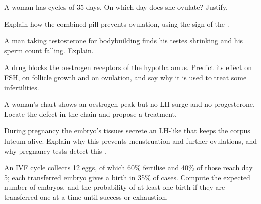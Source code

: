 \begin{exercise}[$\star\star$]\label{exo:g11:hormones-and-reproduction:9}
A woman has cycles of 35 days. On which day does she ovulate?
Justify.
\end{exercise}

\begin{exercise}[$\star\star$]\label{exo:g11:hormones-and-reproduction:10}
Explain how the combined pill prevents ovulation, using the sign of
the .
\end{exercise}

\begin{exercise}[$\star\star$]\label{exo:g11:hormones-and-reproduction:11}
A man taking testosterone for bodybuilding finds his testes shrinking
and his sperm count falling. Explain.
\end{exercise}

\begin{exercise}[$\star\star\star$]\label{exo:g11:hormones-and-reproduction:12}
A drug blocks the oestrogen receptors of the hypothalamus. Predict
its effect on FSH, on follicle growth and on ovulation, and say why
it is used to treat some infertilities.
\end{exercise}

\begin{exercise}[$\star\star\star$]\label{exo:g11:hormones-and-reproduction:13}
A woman's chart shows an oestrogen peak but no LH surge and no
progesterone. Locate the defect in the chain and propose a treatment.
\end{exercise}

\begin{exercise}[$\star\star\star$]\label{exo:g11:hormones-and-reproduction:14}
During pregnancy the embryo's tissues secrete an LH-like  that
keeps the corpus luteum alive. Explain why this prevents menstruation
and further ovulations, and why pregnancy tests detect this .
\end{exercise}

\begin{exercise}[$\star\star\star$]\label{exo:g11:hormones-and-reproduction:15}
An IVF cycle collects 12 eggs, of which 60\% fertilise and 40\% of
those reach day 5; each transferred embryo gives a birth in 35\% of
cases. Compute the expected number of embryos, and the probability of
at least one birth if they are transferred one at a time until
success or exhaustion.
\end{exercise}

